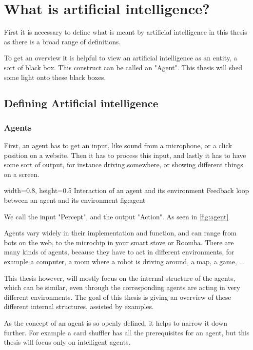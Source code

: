 \chapter{What is artificial intelligence?}
First it is necessary to define what is meant by artificial intelligence in this thesis as there is a broad range of definitions. \cite{definitionAI}

To get an overview it is helpful to view an artificial intelligence as an entity, a sort of black box. This construct can be called an "Agent". 
This thesis will shed some light onto these black boxes.

\section{Defining Artificial intelligence}
\subsection{Agents} \cite[p. 34]{MA}
First, an agent has to get an input, like sound from a microphone, or a click position on a website.
Then it has to process this input, and lastly it has to have some sort of output, for instance driving somewhere, or showing different things on a screen.

    {width=0.8\textwidth, height=0.5\textheight} %
    {Interaction of an agent and its environment}   %
    {Feedback loop between an agent and its environment}   %
    {fig:agent}    %

We call the input "Percept", and the output "Action". As seen in \autoref{fig:agent}

Agents vary widely in their implementation and function, and can range from bots on the web, to the microchip in your smart stove or Roomba. 
There are many kinds of agents, because they have to act in different environments, for example a computer, a room where a robot is driving around, a map, a game, ...

This thesis however, will mostly focus on the internal structure of the agents, which can be similar, even through the corresponding agents are acting in very different environments.
The goal of this thesis is giving an overview of these different internal structures, assisted by examples.

As the concept of an agent is so openly defined, it helps to narrow it down further. For example a card shuffler has all the prerequisites for an agent, but this thesis will focus only on intelligent agents.

